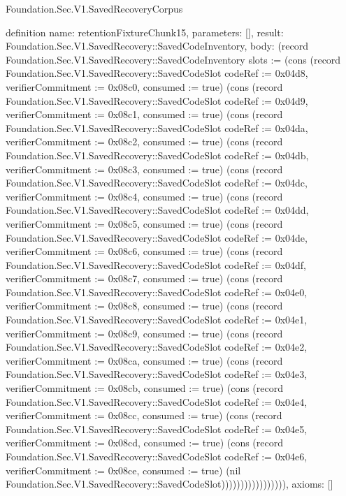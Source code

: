 \begin{lexlean}{Foundation.Sec.V1.SavedRecoveryCorpus}
\begin{semanticmodule}
definition{
  name: retentionFixtureChunk15,
  parameters: [],
  result: Foundation.Sec.V1.SavedRecovery::SavedCodeInventory,
  body: (record Foundation.Sec.V1.SavedRecovery::SavedCodeInventory {slots := (cons (record Foundation.Sec.V1.SavedRecovery::SavedCodeSlot {codeRef := 0x04d8, verifierCommitment := 0x08c0, consumed := true}) (cons (record Foundation.Sec.V1.SavedRecovery::SavedCodeSlot {codeRef := 0x04d9, verifierCommitment := 0x08c1, consumed := true}) (cons (record Foundation.Sec.V1.SavedRecovery::SavedCodeSlot {codeRef := 0x04da, verifierCommitment := 0x08c2, consumed := true}) (cons (record Foundation.Sec.V1.SavedRecovery::SavedCodeSlot {codeRef := 0x04db, verifierCommitment := 0x08c3, consumed := true}) (cons (record Foundation.Sec.V1.SavedRecovery::SavedCodeSlot {codeRef := 0x04dc, verifierCommitment := 0x08c4, consumed := true}) (cons (record Foundation.Sec.V1.SavedRecovery::SavedCodeSlot {codeRef := 0x04dd, verifierCommitment := 0x08c5, consumed := true}) (cons (record Foundation.Sec.V1.SavedRecovery::SavedCodeSlot {codeRef := 0x04de, verifierCommitment := 0x08c6, consumed := true}) (cons (record Foundation.Sec.V1.SavedRecovery::SavedCodeSlot {codeRef := 0x04df, verifierCommitment := 0x08c7, consumed := true}) (cons (record Foundation.Sec.V1.SavedRecovery::SavedCodeSlot {codeRef := 0x04e0, verifierCommitment := 0x08c8, consumed := true}) (cons (record Foundation.Sec.V1.SavedRecovery::SavedCodeSlot {codeRef := 0x04e1, verifierCommitment := 0x08c9, consumed := true}) (cons (record Foundation.Sec.V1.SavedRecovery::SavedCodeSlot {codeRef := 0x04e2, verifierCommitment := 0x08ca, consumed := true}) (cons (record Foundation.Sec.V1.SavedRecovery::SavedCodeSlot {codeRef := 0x04e3, verifierCommitment := 0x08cb, consumed := true}) (cons (record Foundation.Sec.V1.SavedRecovery::SavedCodeSlot {codeRef := 0x04e4, verifierCommitment := 0x08cc, consumed := true}) (cons (record Foundation.Sec.V1.SavedRecovery::SavedCodeSlot {codeRef := 0x04e5, verifierCommitment := 0x08cd, consumed := true}) (cons (record Foundation.Sec.V1.SavedRecovery::SavedCodeSlot {codeRef := 0x04e6, verifierCommitment := 0x08ce, consumed := true}) (nil Foundation.Sec.V1.SavedRecovery::SavedCodeSlot))))))))))))))))}),
  axioms: []
}


\end{semanticmodule}
\end{lexlean}
